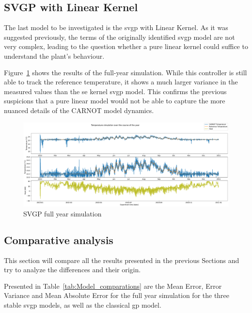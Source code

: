 \subsection{SVGP with Linear Kernel}\label{sec:svgp_linear}

The last model to be investigated is the \acrshort{svgp} with Linear Kernel. As
it was suggested previously, the terms of the originally identified
\acrshort{svgp} model are not very complex, leading to the question whether a
pure linear kernel could suffice to understand the plant's behaviour.

Figure~\ref{fig:SVGP_linear_fullyear_simulation} shows the results of the
full-year simulation. While this controller is still able to track the reference
temperature, it shows a much larger variance in the measured values than the
\acrshort{se} kernel \acrshort{svgp} model. This confirms the previous
suspicions that a pure linear model would not be able to capture the more
nuanced details of the CARNOT model dynamics.

\begin{figure}[ht]
    \centering
    \includegraphics[width =
    \textwidth]{Plots/10_SVGP_480pts_inf_window_12_averageYear_LinearKernel_fullyear.pdf}
    \caption{SVGP full year simulation}
    \label{fig:SVGP_linear_fullyear_simulation}
\end{figure}

\clearpage

\subsection{Comparative analysis}

This section will compare all the results presented in the previous Sections and
try to analyze the differences and their origin.

Presented in Table~\ref{tab:Model_comparations} are the Mean Error, Error
Variance and Mean Absolute Error for the full year simulation for the three
stable \acrshort{svgp} models, as well as the classical \acrshort{gp} model. 

